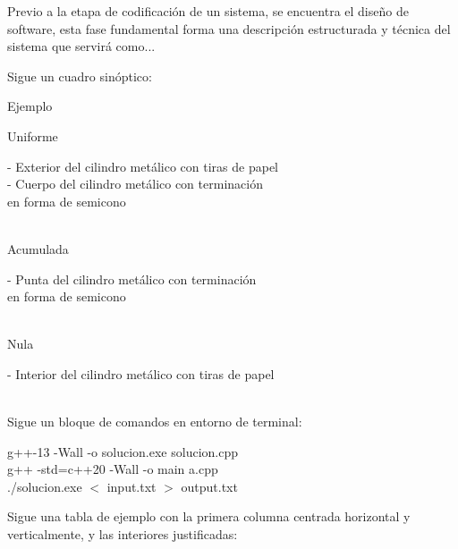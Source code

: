 \documentclass[12pt]{article}
\begin{document}
Previo a la etapa de codificación de un sistema, se encuentra el diseño de software, esta fase fundamental forma una descripción estructurada y técnica del sistema que servirá como...

Sigue un cuadro sinóptico:

Ejemplo
\begin{localsubgroup}
    Uniforme
    \begin{localsubgroup}
        - Exterior del cilindro metálico con tiras de papel \\
        - Cuerpo del cilindro metálico con terminación \\ en forma de semicono
    \end{localsubgroup} \\[1em]

    Acumulada
    \begin{localsubgroup}
        - Punta del cilindro metálico con terminación \\ en forma de semicono
    \end{localsubgroup} \\[1em]

    Nula
    \begin{localsubgroup}
        - Interior del cilindro metálico con tiras de papel
    \end{localsubgroup}
\end{localsubgroup} \\

Sigue un bloque de comandos en entorno de terminal:

\begin{mdframed}[style=terminal]
\ttfamily\upshape\color{bashLetterColor}\footnotesize
g++-13 -Wall -o solucion.exe solucion.cpp \\
g++ -std=c++20 -Wall -o main a.cpp \\
./solucion.exe $<$ input.txt $>$ output.txt
\end{mdframed}

Sigue una tabla de ejemplo con la primera columna centrada horizontal y verticalmente, y las interiores justificadas:
\end{document}
